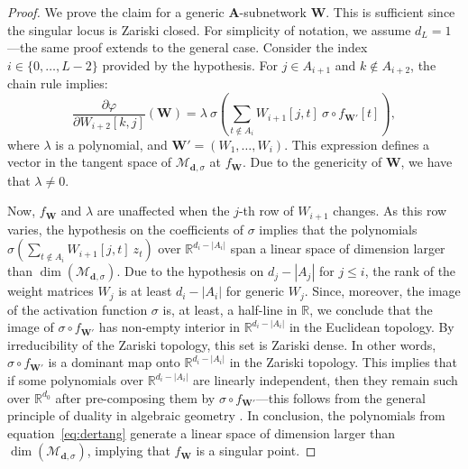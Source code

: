 \documentclass{article} %
\def\eqref#1{equation~\ref{#1}}
\theoremstyle{plain}%
\theoremstyle{definition}
\theoremstyle{remark}
\begin{document}
\begin{proof}
We prove the claim for a generic $\mathbf{A}$-subnetwork $\mathbf{W}$. This is sufficient since the singular locus is Zariski closed.
For simplicity of notation, we assume $d_L=1$---the same proof extends to the general case. Consider the index $i\in \{0, \ldots, L-2\}$ provided by the hypothesis. For $j \in A_{i+1}$ and $k \not \in A_{i+2}$,  the chain rule implies:
\begin{equation}\label{eq:dertang}
\frac{\partial \varphi }{\partial W_{i+2}[k,j]} (\mathbf{W}) = \lambda \ \sigma\left( \sum_{t \not \in A_i} W_{i+1}[j, t] \  \sigma \circ f_{\mathbf{W}'}[t] \right),
\end{equation}
where $\lambda$ is a polynomial, and $\mathbf{W}'=(W_1, \ldots, W_i)$. This expression defines a vector in the tangent space of $\mathcal{M}_{\mathbf{d}, \sigma} $ at $f_\mathbf{W}$. Due to the genericity of $\mathbf{W}$, we have that $\lambda \not = 0$.

Now, $f_\mathbf{W}$ and $\lambda$ are unaffected when the $j$-th row of $W_{i+1}$ changes. As this row varies, the hypothesis on the coefficients of $\sigma$ implies that the polynomials $\sigma(\sum_{t \not \in A_{i}}W_{i+1}[j,t] \ z_t)$ over $\mathbb{R}^{d_i - |A_i|}$ span a linear space of dimension larger than $\dim(\mathcal{M}_{\mathbf{d}, \sigma})$. Due to the hypothesis on $d_j - |A_j|$ for $j \leq i$, the rank of the weight matrices $W_j$ is at least $d_i - |A_i|$ for generic $W_j$. Since, moreover, the image of the activation function $\sigma$ is, at least, a half-line in $\mathbb{R}$,  we conclude that the image of $\sigma \circ f_{\mathbf{W}'}$ has non-empty interior in $\mathbb{R}^{d_i - |A_i|}$ in the Euclidean topology. By irreducibility of the Zariski topology, this set is Zariski dense. In other words, $\sigma \circ f_{\mathbf{W}'}$ is a dominant map onto $\mathbb{R}^{d_i - |A_i|}$ in the Zariski topology. This implies that if some polynomials over $\mathbb{R}^{d_i - |A_i|}$ are linearly independent, then they remain such over $\mathbb{R}^{d_0}$ after pre-composing them by $\sigma \circ f_{\mathbf{W}'}$---this follows from the general principle of duality in algebraic geometry \citep[I, Corollary 1.2.7]{dieudonne1971elements}. In conclusion, the polynomials from \eqref{eq:dertang} generate a linear space of dimension larger than $ \dim(\mathcal{M}_{\mathbf{d}, \sigma})$, implying that $f_\mathbf{W}$ is a singular point. 
\end{proof}
\end{document}
